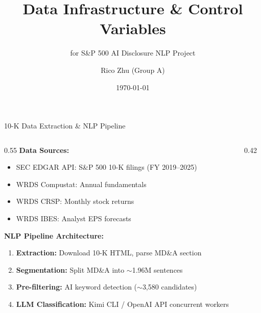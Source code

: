 \documentclass[aspectratio=169]{beamer}
\title[FE-NLP Group A]{Data Infrastructure \& Control Variables}
\subtitle{for S\&P 500 AI Disclosure NLP Project}
\author{Rico Zhu (Group A)}
\institute{Financial Economics Research Lab}
\date{\today}
\begin{document}
\begin{frame}
\titlepage
\end{frame}

\begin{frame}{10-K Data Extraction \& NLP Pipeline}

\begin{columns}[T]
\begin{column}{0.55\textwidth}
\textbf{Data Sources:}
\begin{itemize}
    \item SEC EDGAR API: S\&P 500 10-K filings (FY 2019--2025)
    \item WRDS Compustat: Annual fundamentals
    \item WRDS CRSP: Monthly stock returns
    \item WRDS IBES: Analyst EPS forecasts
\end{itemize}

\vspace{0.3cm}
\textbf{NLP Pipeline Architecture:}
\begin{enumerate}
    \item \textbf{Extraction:} Download 10-K HTML, parse MD\&A section
    \item \textbf{Segmentation:} Split MD\&A into $\sim$1.96M sentences
    \item \textbf{Pre-filtering:} AI keyword detection ($\sim$3,580 candidates)
    \item \textbf{LLM Classification:} Kimi CLI / OpenAI API concurrent workers
\end{enumerate}
\end{column}

\begin{column}{0.42\textwidth}
\end{column}
\end{columns}
\end{frame}
\end{document}
